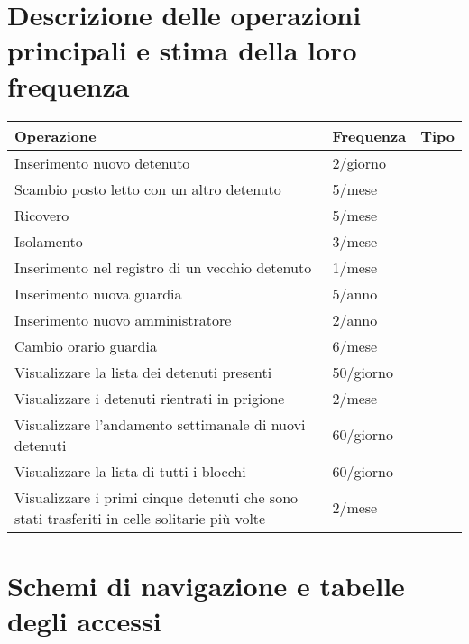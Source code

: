 \documentclass[a4paper,12pt]{report}
\begin{document}
\section{Descrizione delle operazioni principali e stima della loro frequenza}
\begin{table}[H]
\begin{tabular}{p{9cm} p{2cm} p{1cm}}
\hline
Operazione & Frequenza & Tipo \\ \hline
Inserimento nuovo detenuto & 2/giorno &  \\
Scambio posto letto con un altro detenuto & 5/mese &  \\
Ricovero & 5/mese & \\
Isolamento & 3/mese & \\
Inserimento nel registro di un vecchio detenuto & 1/mese & \\
Inserimento nuova guardia & 5/anno & \\
Inserimento nuovo amministratore & 2/anno & \\
Cambio orario guardia & 6/mese & \\
Visualizzare la lista dei detenuti presenti & 50/giorno & \\
Visualizzare i detenuti rientrati in prigione & 2/mese & \\
Visualizzare l'andamento settimanale di nuovi detenuti & 60/giorno & \\
Visualizzare la lista di tutti i blocchi & 60/giorno & \\
Visualizzare i primi cinque detenuti che sono stati trasferiti in celle solitarie più volte & 2/mese &
\end{tabular}
\end{table}
\section{Schemi di navigazione e tabelle degli accessi}
\end{document}
